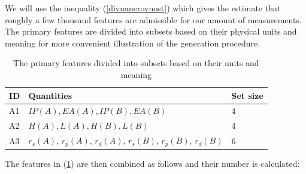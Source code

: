 \documentclass[11pt,oneside,czech,american]{book} %
\theoremstyle{definition} %
\theoremstyle{definition}
\begin{document}
We will use the inequality (\ref{divnanerovnost}) which gives the estimate that roughly a few thousand features are admissible for our amount of measurements. The primary features are divided into subsets based on their physical units and meaning for more convenient illustration of the generation procedure.
\begin{table}[H]
	\centering
	\begin{tabular}{lll} 
		\hline
		ID & Quantities~ ~                                                                                        & Set size  \\ 
		\hline
		A1 & $IP(A), EA(A), IP(B), EA(B)     $                                                                      & 4   \\ 
		
		A2 & $H(A), L(A), H(B), L(B) $                                                                              & 4   \\ 
		
		A3 & $r_{s}(A)$, $r_{p}(A)$, $r_{d}(A)$, $r_{s}(B)$, $r_{p}(B)$, $r_{d}(B)$ & 6   \\
		\hline
	\end{tabular}
	\caption{The primary features divided into subsets based on their units and meaning}
	\label{primary}
\end{table}
The features in (\ref{primary}) are then combined as follows and their number is calculated:
\end{document}
